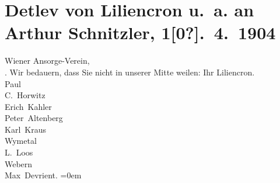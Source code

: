 

         
         \renewcommand{\erwaehntePersonen}{Personen: Max Devrient, Lina Loos, Anton von Webern, Wilhelm von Wymetal}
         \renewcommand{\erwaehnteInstitutionen}{Institutionen: Ansorge-Verein}
         \renewcommand{\erwaehnteOrte}{Orte: Wien}
         \renewcommand{\erwaehnteWerke}{}
               \section[Detlev von Liliencron u. a. an Arthur Schnitzler, 1{[}0?{]}. 4. 1904]{ Detlev von Liliencron u. a. an Arthur Schnitzler,
               1{[}0?{]}. 4. 1904}\nopagebreak{}\rehead{ }\begin{ledgroupsized}[t]{13cm}\normalsize\beginnumbering \toendnotes[C]{\smallbreak\pagebreak[2]} 
\toendnotes[C]{\smallbreak}\pstart
           \raggedleft{}{\pb}Wiener Ansorge-Verein,{\\}\label{T_L01391_1v}\label{T_L01391_1h}.\pend
           \pstart
           Wir bedauern, dass Sie nicht in unserer Mitte weilen:\pend
           \pstart
           Ihr \spacefill\mbox{Liliencron.}{\\[\baselineskip]}\spacefill\mbox{Paul \label{T_L01391_2v}\label{T_L01391_2h}}{\\[\baselineskip]}\spacefill\mbox{C. Horwitz}{\\[\baselineskip]}\spacefill\mbox{Erich Kahler}{\\[\baselineskip]}\spacefill\mbox{Peter Altenberg}{\\[\baselineskip]}\spacefill\mbox{Karl Kraus}{\\[\baselineskip]}\spacefill\mbox{Wymetal}{\\[\baselineskip]}\spacefill\mbox{L. Loos}{\\[\baselineskip]}\spacefill\mbox{Webern}{\\[\baselineskip]}\spacefill\mbox{Max Devrient.}\pend
           \leftskip=0em{}
         
         \endnumbering{}\end{ledgroupsized}  \newcommand{\dateiname}{L01391}\newcommand{\titel}{Detlev von Liliencron u. a. an Arthur Schnitzler, 1[0?]. 4. 1904}\newcommand{\editorInnen}{Martin Anton Müller und Gerd-Hermann Susen}
      